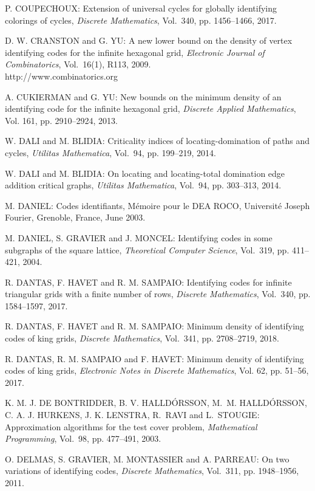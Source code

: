 \begin{thebibliography}{999}
P. COUPECHOUX: Extension of universal cycles for globally identifying colorings of cycles, {\it Discrete Mathematics}, Vol.~340, pp. 1456--1466, 2017.
  
D. W. CRANSTON and G. YU: A new lower bound on the density of vertex identifying codes for the infinite hexagonal grid, {\it Electronic Journal of Combinatorics}, Vol.~16(1), R113, 2009.\\
http://www.combinatorics.org   

A. CUKIERMAN and G. YU: New bounds on the minimum density of an identifying code for the infinite hexagonal grid, {\it Discrete Applied Mathematics}, Vol. 161, pp. 2910--2924, 2013.

  W. DALI and M. BLIDIA: Criticality indices of locating-domination of paths and cycles, {\it Utilitas Mathematica}, Vol.~94, pp. 199--219, 2014.

W. DALI and M. BLIDIA: On locating and locating-total domination edge addition critical graphs, {\it Utilitas Mathematica}, Vol.~94, pp. 303--313, 2014.

M. DANIEL: Codes identifiants, M\'emoire pour le DEA ROCO, Universit\'e Joseph Fourier, Grenoble, France, June 2003.

M. DANIEL, S. GRAVIER and J. MONCEL: Identifying codes in some subgraphs of the square lattice, {\it Theoretical Computer Science}, Vol.~319, pp. 411--421, 2004.

R. DANTAS, F. HAVET and R. M. SAMPAIO: Identifying codes for infinite triangular grids with a finite number of rows, {\it Discrete Mathematics}, Vol.~340, pp. 1584--1597, 2017.

R. DANTAS, F. HAVET and R. M. SAMPAIO: Minimum density of identifying codes of king grids, {\it Discrete Mathematics}, Vol.~341, pp. 2708--2719, 2018. 

R. DANTAS, R. M. SAMPAIO and F. HAVET: Minimum density of identifying codes of king grids, {\it Electronic Notes in Discrete Mathematics}, Vol. 62, pp. 51--56, 2017. 

K. M. J. DE BONTRIDDER, B. V. HALLD\'ORSSON, M.~M. HALL\-D\'ORS\-SON, C. A. J. HURKENS, J. K. LENSTRA, R.~RAVI and L.~STOU\-GIE: Approximation algorithms for the test cover problem, {\it Mathematical Programming}, Vol.~98, pp. 477--491, 2003.

O. DELMAS, S. GRAVIER, M. MONTASSIER and A. PARREAU: On two variations of identifying codes, {\it Discrete Mathematics}, Vol.~311, pp. 1948--1956, 2011.


\end{thebibliography}
